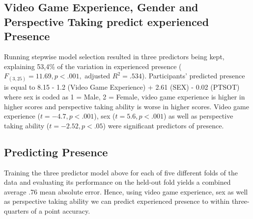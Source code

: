 \subsection{Video Game Experience, Gender and Perspective Taking predict experienced Presence} Running stepwise model selection resulted in three predictors being kept, explaining 53,4\% of the variation in experienced presence ($F_{(3,25)}=11.69, p < .001,$ adjusted $R^2=.534$). Participants' predicted presence is equal to 8.15 - 1.2 (Video Game Experience) + 2.61 (SEX) - 0.02 (PTSOT) where sex is coded as 1 = Male, 2 = Female, video game experience is higher in higher scores and perspective taking ability is worse in higher scores. Video game experience ($t=-4.7, p<.001$), sex ($t=5.6, p<.001$) as well as perspective taking ability ($t=-2.52, p<.05$) were significant predictors of presence.

\subsection{Predicting Presence} Training the three predictor model above for each of five different folds of the data and evaluating its performance on the held-out fold yields a combined average .76 mean absolute error. Hence, using video game experience, sex as well as perspective taking ability we can predict experienced presence to within three-quarters of a point accuracy.